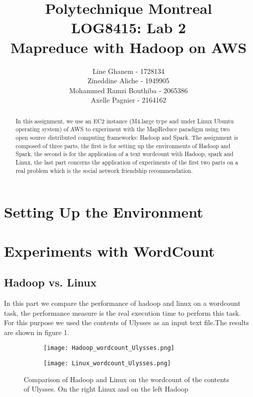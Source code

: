 \documentclass[12pt]{article}
\title{Polytechnique Montreal \\
LOG8415: Lab 2\\
Mapreduce with Hadoop on AWS}
\author{Line Ghanem - 1728134\\Zineddine Aliche - 1949905\\
Mohammed Ramzi Bouthiba - 2065386\\Axelle Pagnier - 2164162}
\begin{document}
\maketitle

\begin{abstract}
In this assignment, we use an EC2 instance (M4.large type and under Linux Ubuntu operating system) of AWS to experiment with the MapReduce paradigm using two open source distributed computing frameworks: Hadoop and Spark. The assignment is composed of three parts, the first is for setting up the environments of Hadoop and Spark, the second is for the application of a text wordcount with Hadoop, spark and Linux, the last part concerns the application of experiments of the first two parts on a real problem which is the social network friendship recommendation.
\end{abstract}

\section{Setting Up the Environment}


\section{Experiments with WordCount}
\subsection{Hadoop vs. Linux}
In this part we compare the performance of hadoop and linux on a wordcount task, the performance measure is the real execution time to perform this task. For this purpose we used the contents of Ulysses as an input text file.The results are shown in figure 1.
\begin{figure}[h]
    
     \begin{subfigure}[b]{0.41\textwidth}
         
         \texttt{[image: Hadoop\_wordcount\_Ulysses.png]}
         
     \end{subfigure}
     \hfill
     \begin{subfigure}[b]{0.41\textwidth}
         
         \texttt{[image: Linux\_wordcount\_Ulysses.png]}
         
     \end{subfigure}
     \hfill
        \centering
        \caption{Comparison of Hadoop and Linux on the wordcount of the contents of Ulysses. On the right Linux and on the left Hadoop}
        \label{fig:three graphs}
\end{figure}
\end{document}
